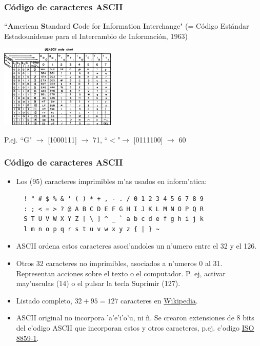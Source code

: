\documentclass{beamer}
\begin{document}
\begin{frame}[fragile]\frametitle{Código de caracteres ASCII}
\begin{block}{}
``\textbf{A}merican \textbf{S}tandard \textbf{C}ode for \textbf{I}nformation \textbf{I}nterchange" (= Código Estándar Estadounidense para el Intercambio de Información, 1963)
\end{block}
\begin{center}
	\includegraphics[width=5.5cm]{figs/USASCII_code_chart.png}
\end{center}
 P.ej. ``G" $\rightarrow$ [1000111] $\rightarrow$ 71, \qquad  ``$<$"$ \rightarrow$ [0111100] $\rightarrow$ 60
\end{frame}


\begin{frame}[fragile]\frametitle{Código de caracteres ASCII}
\begin{itemize}
\item Los (95) caracteres imprimibles m'as usados en inform'atica:
\begin{verbatim}
  ! " # $ % & ' ( ) * + , - . / 0 1 2 3 4 5 6 7 8 9 
  : ; < = > ? @ A B C D E F G H I J K L M N O P Q R 
  S T U V W X Y Z [ \ ] ^ _ ` a b c d e f g h i j k 
  l m n o p q r s t u v w x y z { | } ~ 
\end{verbatim}
\item ASCII ordena estos caracteres asoci'andoles un n'umero entre el 32 y el 126. 
\item Otros 32 caracteres no imprimibles, asociados a n'umeros 0 al 31. Representan acciones sobre el texto o el computador. P. ej, activar may'usculas (14) o el pulsar la tecla Suprimir (127). 
\item Listado completo, $32+95 = 127$ caracteres en \href{https://es.wikipedia.org/wiki/ASCII}{Wikipedia}.

\item ASCII original no incorpora 'a'e'i'o'u, ni  \~n. Se crearon extensiones de 8 bits del c'odigo ASCII que incorporan estos y otros caracteres, p.ej. c'odigo \href{https://es.wikipedia.org/wiki/ISO/IEC_8859-1}{ISO 8859-1}.
\end{itemize}
\end{frame}
\end{document}
